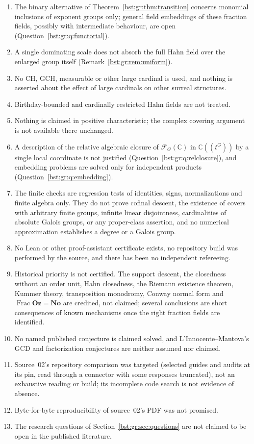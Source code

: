 \documentclass[11pt,letterpaper]{article}
\theoremstyle{definition}
\theoremstyle{remark}
\newcommand{\C}{\mathbb C}
\newcommand{\No}{\mathbf{No}}
\newcommand{\Frac}{\operatorname{Frac}}
\newcommand{\HH}[2]{#1((t^{#2}))}
\newcommand{\FF}[2]{\mathcal F_{#2}(#1)}
\newcommand{\Oz}{\mathbf{Oz}}
\begin{document}
\begin{enumerate}
$\Lambda/F$ does not become equal to its base, and its automorphisms do not
cease to exist.
\item The binary alternative of Theorem~\ref{bst:gr:thm:transition} concerns
monomial inclusions of exponent groups only; general field embeddings of
these fraction fields, possibly with intermediate behaviour, are open
(Question~\ref{bst:gr:q:functorial}).
\item A single dominating scale does not absorb the full Hahn field over the
enlarged group itself (Remark~\ref{bst:gr:rem:uniform}).
\item No CH, GCH, measurable or other large cardinal is used, and nothing is
asserted about the effect of large cardinals on other surreal structures.
\item Birthday-bounded and cardinally restricted Hahn fields are not treated.
\item Nothing is claimed in positive characteristic; the complex covering
argument is not available there unchanged.
\item A description of the relative algebraic closure of $\FF{\C}G$ in
$\HH{\C}G$ by a single local coordinate is not justified
(Question~\ref{bst:gr:q:relclosure}), and embedding problems are solved only
for independent products (Question~\ref{bst:gr:q:embedding}).
\item The finite checks are regression tests of identities, signs,
normalizations and finite algebra only. They do not prove cofinal descent,
the existence of covers with arbitrary finite groups, infinite linear
disjointness, cardinalities of absolute Galois groups, or any proper-class
assertion, and no numerical approximation establishes a degree or a Galois
group.
\item No Lean or other proof-assistant certificate exists, no repository
build was performed by the source, and there has been no independent
refereeing.
\item Historical priority is not certified. The support descent, the
closedness without an order unit, Hahn closedness, the Riemann existence
theorem, Kummer theory, transposition monodromy, Conway normal form and
$\Frac\Oz=\No$ are credited, not claimed; several conclusions are short
consequences of known mechanisms once the right fraction fields are
identified.
\item No named published conjecture is claimed solved, and
L'Innocente--Mantova's GCD and factorization conjectures are neither assumed
nor claimed.
\item Source~02's repository comparison was targeted (selected guides and
audits at its pin, read through a connector with some responses truncated),
not an exhaustive reading or build; its incomplete code search is not
evidence of absence.
\item Byte-for-byte reproducibility of source~02's PDF was not promised.
\item The research questions of Section~\ref{bst:gr:sec:questions} are not
claimed to be open in the published literature.
\end{enumerate}
\end{document}
